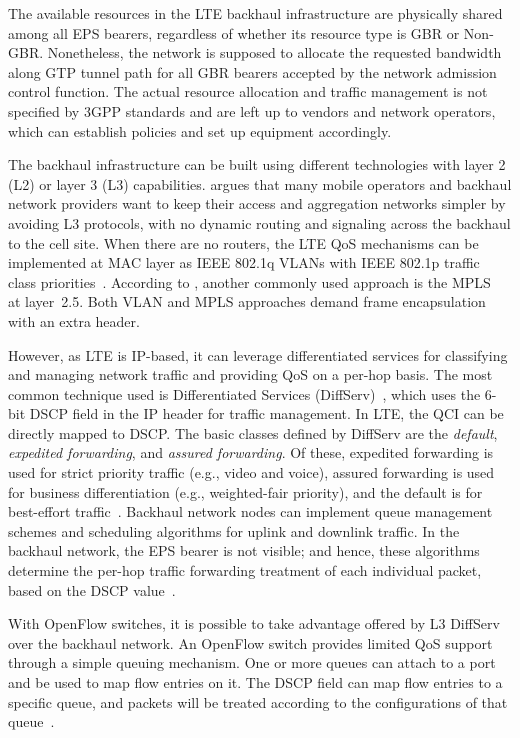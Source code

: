 The available resources in the \ac{LTE} backhaul infrastructure are physically
shared among all \ac{EPS} bearers, regardless of whether its resource type is
\ac{GBR} or Non-\ac{GBR}. Nonetheless, the network is supposed to allocate the
requested bandwidth along \ac{GTP} tunnel path for all \ac{GBR} bearers
accepted by the network admission control function. The actual resource
allocation and traffic management is not specified by \ac{3GPP} standards and
are left up to vendors and network operators, which can establish policies and
set up equipment accordingly.

The backhaul infrastructure can be built using different technologies with
layer 2 (L2) or layer 3 (L3) capabilities. \citet{Howard2011} argues that many
mobile operators and backhaul network providers want to keep their access and
aggregation networks simpler by avoiding L3 protocols, with no dynamic routing
and signaling across the backhaul to the cell site. When there are no routers,
the \ac{LTE} \ac{QoS} mechanisms can be implemented at \ac{MAC} layer as
\acs{IEEE} 802.1q \acp{VLAN} with \acs{IEEE} 802.1p traffic class
priorities~\cite{8021d2004}. According to \citet{Kempf2012a}, another commonly
used approach is the \ac{MPLS}~\cite{mpls} at layer~2.5. Both \ac{VLAN} and
\ac{MPLS} approaches demand frame encapsulation with an extra header.

However, as \ac{LTE} is \ac{IP}-based, it can leverage differentiated services
for classifying and managing network traffic and providing \ac{QoS} on a
per-hop basis. The most common technique used is Differentiated Services
(DiffServ)~\cite{rfc2474}, which uses the 6-bit \ac{DSCP} field in the \ac{IP}
header for traffic management. In \ac{LTE}, the \ac{QCI} can be directly mapped
to \ac{DSCP}. The basic classes defined by DiffServ are the \emph{default},
\emph{expedited forwarding}, and \emph{assured forwarding}. Of these, expedited
forwarding is used for strict priority traffic (e.g., video and voice), assured
forwarding is used for business differentiation (e.g., weighted-fair priority),
and the default is for best-effort traffic~\cite{Sandvine2014}. Backhaul
network nodes can implement queue management schemes and scheduling algorithms
for uplink and downlink traffic. In the backhaul network, the \ac{EPS} bearer
is not visible; and hence, these algorithms determine the per-hop traffic
forwarding treatment of each individual packet, based on the \ac{DSCP}
value~\cite{Ekstrom2009}.

With OpenFlow switches, it is possible to take advantage offered by L3 DiffServ
over the backhaul network. An OpenFlow switch provides limited \ac{QoS} support
through a simple queuing mechanism. One or more queues can attach to a port
and be used to map flow entries on it. The \ac{DSCP} field can map flow entries
to a specific queue, and packets will be treated according to the
configurations of that queue~\cite{ofs151}. 

